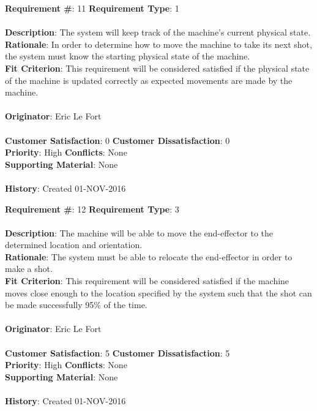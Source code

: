 \documentclass[titlepage]{article}
\begin{document}
\begin{framed}
	\noindent\textbf{Requirement \#}: 11 \hfill \textbf{Requirement Type}: 1 \hfill\\\\
	\noindent\textbf{Description}: The system will keep track of the machine's current physical state.\\
	\textbf{Rationale}: In order to determine how to move the machine to take its next shot, the system must know the starting physical state of the machine.\\
	\textbf{Fit Criterion}: This requirement will be considered satisfied if the physical state of the machine is updated correctly as expected movements are made by the machine.\\\\
	\textbf{Originator}: Eric Le Fort\\\\
	\noindent\textbf{Customer Satisfaction}: 0 \hfill 	\textbf{Customer Dissatisfaction}: 0 \hfill\\
	\textbf{Priority}: High \hfill \textbf{Conflicts}: None \hfill\\
	\textbf{Supporting Material}: None\\\\
	\noindent\textbf{History}: Created 01-NOV-2016
\end{framed}

\begin{framed}
	\noindent\textbf{Requirement \#}: 12 \hfill \textbf{Requirement Type}: 3 \hfill\\\\
	\noindent\textbf{Description}: The machine will be able to move the end-effector to the determined location and orientation.\\
	\textbf{Rationale}: The system must be able to relocate the end-effector in order to make a shot.\\
	\textbf{Fit Criterion}: This requirement will be considered satisfied if the machine moves close enough to the location specified by the system such that the shot can be made successfully 95\% of the time.\\\\
	\textbf{Originator}: Eric Le Fort\\\\
	\noindent\textbf{Customer Satisfaction}: 5 \hfill 	\textbf{Customer Dissatisfaction}: 5 \hfill\\
	\textbf{Priority}: High \hfill \textbf{Conflicts}: None \hfill\\
	\textbf{Supporting Material}: None\\\\
	\noindent\textbf{History}: Created 01-NOV-2016
\end{framed}
\end{document}
